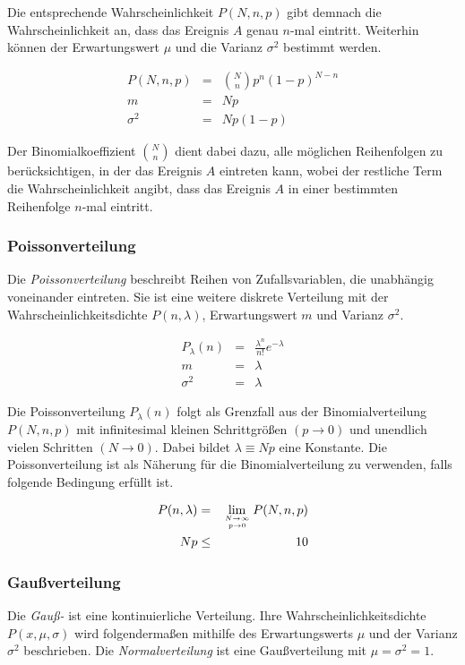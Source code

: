 \documentclass[12pt,a4paper]{scrartcl}
\numberwithin{equation}{section} %
\renewcommand{\[}{} %
\renewcommand{\]}{\noindent} %
\begin{document}
Die entsprechende  Wahrscheinlichkeit $P(N,n,p)$ gibt demnach die Wahrscheinlichkeit an, dass das Ereignis $A$ genau $n$-mal eintritt. Weiterhin können der Erwartungswert $\mu$ und die Varianz $\sigma^2$ bestimmt werden.

\begin{eqnarray}
	P(N,n,p) &=& \binom{N}{n} p^n (1-p)^{N-n} \\
	m &=& Np \\
	\sigma^2 &=& N p (1-p)
\end{eqnarray}

\noindent
Der Binomialkoeffizient $\binom{N}{n}$ dient dabei dazu, alle möglichen Reihenfolgen zu berücksichtigen, in der das Ereignis $A$ eintreten kann, wobei der restliche Term die Wahrscheinlichkeit angibt, dass das Ereignis $A$ in einer bestimmten Reihenfolge $n$-mal eintritt.

\subsubsection{Poissonverteilung}
\label{Poissonverteilung}
Die \emph{Poissonverteilung} beschreibt Reihen von Zufallsvariablen, die unabhängig voneinander eintreten. Sie ist eine weitere diskrete Verteilung mit der Wahrscheinlichkeitsdichte $P(n,\lambda)$, Erwartungswert $m$ und Varianz $\sigma^2$.

\begin{eqnarray}
	P_\lambda(n) &=& \frac{\lambda^n}{n!} e^{-\lambda}
	\label{eq:poisson} \\
	m &=& \lambda \\
	\sigma^2 &=& \lambda
\end{eqnarray}

\noindent
Die Poissonverteilung $P_\lambda(n)$ folgt als Grenzfall aus der Binomialverteilung $P(N, n, p)$ mit infinitesimal kleinen Schrittgrößen $(p\rightarrow 0)$ und unendlich vielen Schritten $(N\rightarrow 0)$. Dabei bildet $\lambda\equiv Np$ eine Konstante. Die Poissonverteilung ist als Näherung für die Binomialverteilung zu verwenden, falls folgende Bedingung erfüllt ist.

\begin{eqnarray}
	P(n, \lambda)  &=& \lim_{N \rightarrow \infty \atop p\rightarrow 0} P(N, n, p) \\
	N p &\leq& 10
\end{eqnarray}

\subsubsection{Gaußverteilung}
\label{Gaußverteilung}
Die \emph{Gauß-} ist eine kontinuierliche Verteilung. Ihre Wahrscheinlichkeitsdichte $P(x,\mu,\sigma)$ wird folgendermaßen mithilfe des Erwartungswerts $\mu$ und der Varianz $\sigma^2$ beschrieben. Die \emph{Normalverteilung}  ist eine Gaußverteilung mit $\mu=\sigma^2=1$.
\end{document}
